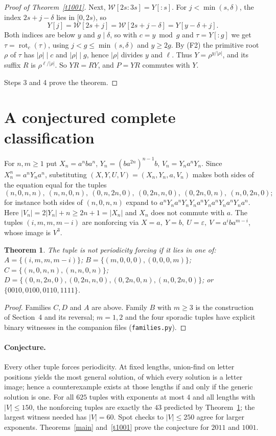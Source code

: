 \documentclass[11pt]{article}
\newtheorem{theorem}{Theorem}
\newcommand{\eps}{\varepsilon}
\theoremstyle{remark}\newtheorem*{remark}{Remark}
\begin{document}
\begin{proof}[Proof of Theorem~\ref{t1001}]
Next, \(\mathcal W[2s{:}3s]=Y[{:}s]\). For \(j<\min(s,\delta)\), the index \(2s+j-\delta\) lies in \([0,2s)\), so
\[
 Y[j]=\mathcal W[2s+j]=\mathcal W[2s+j-\delta]=Y[y-\delta+j].
\]
Both indices are below \(y\) and \(g\mid\delta\), so with \(c=y\bmod g\) and \(\tau=Y[{:}g]\) we get \(\tau=\operatorname{rot}_c(\tau)\), using \(j<g\le\min(s,\delta)\) and \(y\ge2g\). By (F2) the primitive root \(\rho\) of \(\tau\) has \(|\rho|\mid c\) and \(|\rho|\mid g\), hence \(|\rho|\) divides \(y\) and \(\ell\). Thus \(Y=\rho^{y/|\rho|}\), and its suffix \(R\) is \(\rho^{\ell/|\rho|}\). So \(YR=RY\), and \(P=YR\) commutes with \(Y\).

Steps 3 and 4 prove the theorem.
\end{proof}

\section{A conjectured complete classification}
For \(n,m\ge1\) put \(X_n=a^nba^n\), \(Y_n=(ba^{2n})^{n-1}b\), \(V_n=Y_na^nY_n\). Since \(X_n^n=a^nY_na^n\), substituting \((X,Y,U,V)=(X_n,Y_n,a,V_n)\) makes both sides of the equation equal for the tuples
\[
(n,0,n,n),\ (n,n,0,n),\ (0,n,2n,0),\ (0,2n,n,0),\ (0,2n,0,n),\ (n,0,2n,0);
\]
for instance both sides of \((n,0,n,n)\) expand to \(a^nY_na^nY_nY_na^nY_na^nY_na^nY_na^n\). Here \(|V_n|=2|Y_n|+n\ge 2n+1=|X_n|\) and \(X_n\) does not commute with \(a\). The tuples \((i,m,m,m-i)\) are nonforcing via \(X=a,\ Y=b,\ U=\eps,\ V=a^iba^{m-i}\), whose image is \(V^3\).

\begin{theorem}\label{nonforcing}
The tuple is not periodicity forcing if it lies in one of: \(A=\{(i,m,m,m-i)\}\); \(B=\{(m,0,0,0),(0,0,0,m)\}\); \(C=\{(n,0,n,n),(n,n,0,n)\}\); \(D=\{(0,n,2n,0),(0,2n,n,0),(0,2n,0,n),(n,0,2n,0)\}\); or \(\{0010,0100,0110,1111\}\).
\end{theorem}
\begin{proof}
Families \(C,D\) and \(A\) are above. Family \(B\) with \(m\ge3\) is the construction of Section~4 and its reversal; \(m=1,2\) and the four sporadic tuples have explicit binary witnesses in the companion files (\texttt{families.py}).
\end{proof}

\paragraph{Conjecture.} Every other tuple forces periodicity. At fixed lengths, union-find on letter positions yields the most general solution, of which every solution is a letter image; hence a counterexample exists at those lengths if and only if the generic solution is one. For all \(625\) tuples with exponents at most \(4\) and all lengths with \(|V|\le150\), the nonforcing tuples are exactly the \(43\) predicted by Theorem~\ref{nonforcing}; the largest witness needed has \(|V|=60\). Spot checks to \(|V|\le250\) agree for larger exponents. Theorems~\ref{main} and~\ref{t1001} prove the conjecture for \(2011\) and \(1001\).
\end{document}
